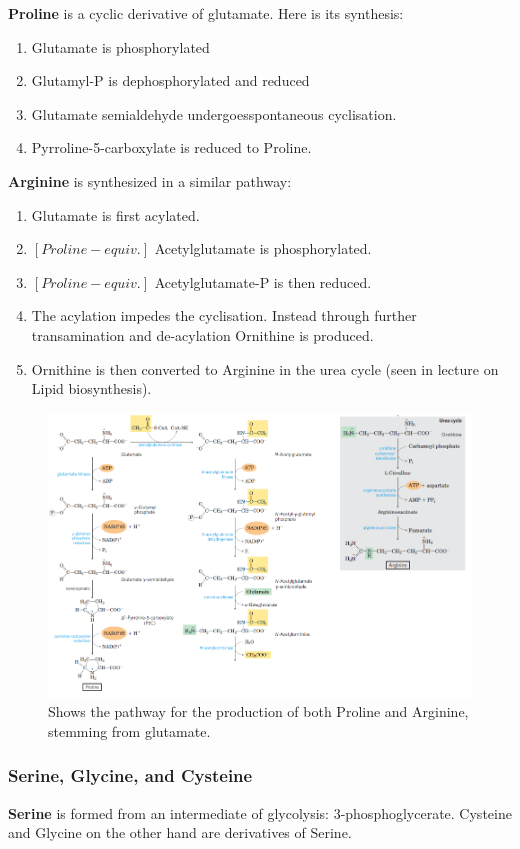\documentclass[../main.tex]{subfiles}
\begin{document}
\textbf{\gls{Proline}} is a cyclic derivative of glutamate. Here is its synthesis:
\begin{enumerate}
	\item Glutamate is phosphorylated
	\item Glutamyl-P is dephosphorylated and reduced
	\item Glutamate semialdehyde undergoesspontaneous cyclisation.
	\item Pyrroline-5-carboxylate is reduced to Proline.
\end{enumerate}

\textbf{\gls{Arginine}} is synthesized in a similar pathway:
\begin{enumerate}
	\item Glutamate is first acylated.
	\item $[Proline-equiv.]$ Acetylglutamate is phosphorylated.
	\item $[Proline-equiv.]$ Acetylglutamate-P is then reduced.
	\item The acylation impedes the cyclisation. Instead through further transamination and de-acylation Ornithine is produced.
	\item Ornithine is then converted to Arginine in the urea cycle (seen in lecture on Lipid biosynthesis).
\end{enumerate}

\begin{figure}[H]
	\centering
	\includegraphics[width=0.6\linewidth]{pro_arg}
	\caption{Shows the pathway for the production of both Proline and Arginine, stemming from glutamate.}
	\label{fig:proarg}
\end{figure}


\subsubsection{Serine, Glycine, and Cysteine}

\textbf{\gls{Serine}} is formed from an intermediate of glycolysis: 3-phosphoglycerate. Cysteine and Glycine on the other hand are derivatives of Serine. \\
\end{document}
